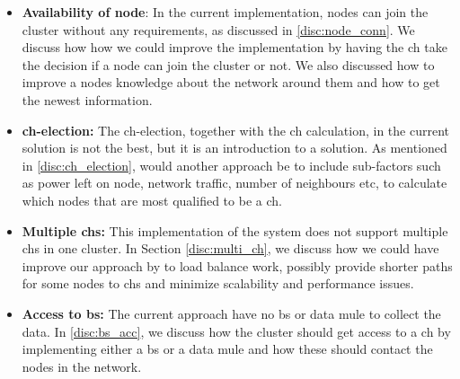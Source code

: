 \documentclass[USenglish]{uit-thesis}
\begin{document}
\begin{itemize}
\item \textbf{Availability of node}: In the current implementation, nodes can join the cluster without any requirements, as discussed in \autoref{disc:node_conn}. We discuss how  how we could improve the implementation by having the \gls{ch} take the decision if a node can join the cluster or not. We also discussed how to improve a nodes knowledge about the network around them and how to get the newest information.

\item \textbf{\gls{ch}-election:} The \gls{ch}-election, together with the \gls{ch} calculation, in the current solution is not the best, but it is an introduction to a solution. As mentioned in \autoref{disc:ch_election}, would another approach be to include sub-factors such as power left on node, network traffic, number of neighbours etc, to calculate which nodes that are most qualified to be a \gls{ch}. 

\item \textbf{Multiple \glspl{ch}:} This implementation of the system does not support multiple \glspl{ch} in one cluster. In Section \autoref{disc:multi_ch}, we discuss how we could have improve our approach by to load balance work, possibly provide shorter paths for some nodes to \glspl{ch} and minimize scalability and performance issues.

\item \textbf{Access to \gls{bs}:} The current approach have no \gls{bs} or data mule to collect the data. In \autoref{disc:bs_acc}, we discuss how the cluster should get access to a \gls{ch} by implementing either a \gls{bs} or a data mule and how these should contact the nodes in the network.

\end{itemize}



\newpage{}
\end{document}
